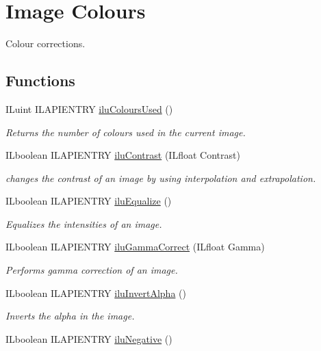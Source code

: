 \hypertarget{group__ilu__colour}{\section{Image Colours}
\label{group__ilu__colour}
}


Colour corrections.  


\subsection*{Functions}
\begin{DoxyCompactItemize}
\item 
I\+Luint I\+L\+A\+P\+I\+E\+N\+T\+R\+Y \hyperlink{group__ilu__colour_ga1c019783a7ab60a1b9fee1ed5b2aadbe}{ilu\+Colours\+Used} ()
\begin{DoxyCompactList}\small\item\em Returns the number of colours used in the current image. \end{DoxyCompactList}\item 
I\+Lboolean I\+L\+A\+P\+I\+E\+N\+T\+R\+Y \hyperlink{group__ilu__colour_ga674c6a79168815f579338c30e94cd086}{ilu\+Contrast} (I\+Lfloat Contrast)
\begin{DoxyCompactList}\small\item\em changes the contrast of an image by using interpolation and extrapolation. \end{DoxyCompactList}\item 
I\+Lboolean I\+L\+A\+P\+I\+E\+N\+T\+R\+Y \hyperlink{group__ilu__colour_ga5543086bca10106a064d3dce59770312}{ilu\+Equalize} ()
\begin{DoxyCompactList}\small\item\em Equalizes the intensities of an image. \end{DoxyCompactList}\item 
I\+Lboolean I\+L\+A\+P\+I\+E\+N\+T\+R\+Y \hyperlink{group__ilu__colour_ga06739004ee4930a65ebf57354060095a}{ilu\+Gamma\+Correct} (I\+Lfloat Gamma)
\begin{DoxyCompactList}\small\item\em Performs gamma correction of an image. \end{DoxyCompactList}\item 
I\+Lboolean I\+L\+A\+P\+I\+E\+N\+T\+R\+Y \hyperlink{group__ilu__colour_ga0e3910809ea18e77a83cee05e12613ef}{ilu\+Invert\+Alpha} ()
\begin{DoxyCompactList}\small\item\em Inverts the alpha in the image. \end{DoxyCompactList}\item 
\hypertarget{group__ilu__colour_ga9606e892974b44e5457bc6f95de0970d}{I\+Lboolean I\+L\+A\+P\+I\+E\+N\+T\+R\+Y \hyperlink{group__ilu__colour_ga9606e892974b44e5457bc6f95de0970d}{ilu\+Negative} ()}\label{group__ilu__colour_ga9606e892974b44e5457bc6f95de0970d}


\end{DoxyCompactItemize}
